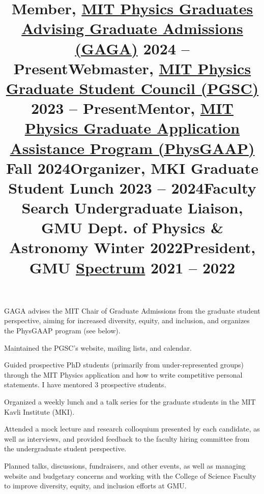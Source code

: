 \documentclass[marg, centered]{res}
\begin{document}
\begin{resume}
\vspace{-0.2cm}
\title{\textbf{Member}, \href{https://physics-gsc.scripts.mit.edu/home/gaga/}{\color{dkbu} MIT Physics Graduates Advising Graduate Admissions (GAGA)} \hfill \textbf{2024 -- Present}}
\begin{position}
{\small GAGA advises the MIT Chair of Graduate Admissions from the graduate student perspective, aiming for increased diversity, equity, and inclusion, and organizes the PhysGAAP program (see below).}
\end{position}

\vspace{-0.2cm}
\title{\textbf{Webmaster}, \href{https://physics-gsc.scripts.mit.edu/home/}{\color{dkbu} MIT Physics Graduate Student Council (PGSC)} \hfill \textbf{2023 -- Present}}
\begin{position}
{\small Maintained the PGSC's website, mailing lists, and calendar.}
\end{position}

\vspace{-0.2cm}
\title{\textbf{Mentor}, \href{https://sites.mit.edu/physgaap/}{\color{dkbu} MIT Physics Graduate Application Assistance Program (PhysGAAP)} \hfill \textbf{Fall 2024}}
\begin{position}
{\small Guided prospective PhD students (primarily from under-represented groups) through the MIT Physics application and how to write competitive personal statements.  I have mentored 3 prospective students.}
\end{position}

\vspace{-0.2cm}
\title{\textbf{Organizer}, MKI Graduate Student Lunch \hfill \textbf{2023 -- 2024}}
\begin{position}
{\small Organized a weekly lunch and a talk series for the graduate students in the MIT Kavli Institute (MKI).}
\end{position}

\vspace{-0.2cm}
\title{\textbf{Faculty Search Undergraduate Liaison}, GMU Dept. of Physics \& Astronomy \hfill \textbf{Winter 2022}}
\begin{position}
{\small Attended a mock lecture and research colloquium presented by each candidate, as well as interviews, and provided feedback to the faculty hiring committee from the undergraduate student perspective.}
\end{position}

\vspace{-0.2cm}
\title{\textbf{President}, GMU \href{https://gmuspectrum.squarespace.com/}{\color{dkbu} Spectrum} \hfill \textbf{2021 -- 2022}}
\begin{position}
{\small Planned talks, discussions, fundraisers, and other events, as well as managing website and budgetary concerns and working with the College of Science Faculty to improve diversity, equity, and inclusion efforts at GMU.}
\end{position}


\end{resume}
\end{document}
